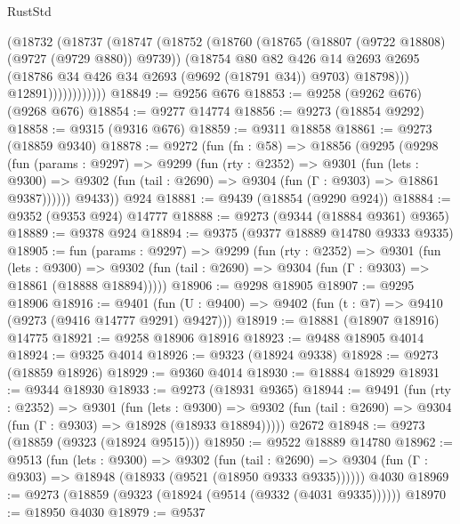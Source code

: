 \begin{lexlean}{RustStd}
\begin{coremodule}
{\begin{coremodule}
{{{{{{{{{{{{{{{{{{{{{{{{{{{{{{{{{{{{{{{{{{{{{{{{{{{{{{{                      (@18732
                        (@18737
                          (@18747
                            (@18752
                              (@18760
                                (@18765 (@18807 (@9722 @18808) (@9727 (@9729 @880)) @9739))
                                (@18754
                                  @80
                                  @82
                                  @426
                                  @14
                                  @2693
                                  @2695
                                  (@18786 @34 @426 @34 @2693 (@9692 (@18791 @34)) @9703)
                                  @18798)))
                            @12891))))))))))))
@18849 := @9256 @676
@18853 := @9258 (@9262 @676) (@9268 @676)
@18854 := @9277 @14774
@18856 := @9273 (@18854 @9292)
@18858 := @9315 (@9316 @676)
@18859 := @9311 @18858
@18861 := @9273 (@18859 @9340)
@18878 := @9272
    (fun (fn : @58) =>
    @18856
      (@9295
        (@9298
          (fun (params : @9297) =>
          @9299
            (fun (rty : @2352) =>
            @9301
              (fun (lets : @9300) =>
              @9302 (fun (tail : @2690) => @9304 (fun (Γ : @9303) => @18861 @9387))))))
        @9433))
    @924
@18881 := @9439 (@18854 (@9290 @924))
@18884 := @9352 (@9353 @924) @14777
@18888 := @9273 (@9344 (@18884 @9361) @9365)
@18889 := @9378 @924
@18894 := @9375 (@9377 @18889 @14780 @9333 @9335)
@18905 := fun (params : @9297) =>
  @9299
    (fun (rty : @2352) =>
    @9301
      (fun (lets : @9300) =>
      @9302 (fun (tail : @2690) => @9304 (fun (Γ : @9303) => @18861 (@18888 @18894)))))
@18906 := @9298 @18905
@18907 := @9295 @18906
@18916 := @9401
    (fun (U : @9400) => @9402 (fun (t : @7) => @9410 (@9273 (@9416 @14777 @9291) @9427)))
@18919 := @18881 (@18907 @18916) @14775
@18921 := @9258 @18906 @18916
@18923 := @9488 @18905 @4014
@18924 := @9325 @4014
@18926 := @9323 (@18924 @9338)
@18928 := @9273 (@18859 @18926)
@18929 := @9360 @4014
@18930 := @18884 @18929
@18931 := @9344 @18930
@18933 := @9273 (@18931 @9365)
@18944 := @9491
    (fun (rty : @2352) =>
    @9301
      (fun (lets : @9300) =>
      @9302 (fun (tail : @2690) => @9304 (fun (Γ : @9303) => @18928 (@18933 @18894)))))
    @2672
@18948 := @9273 (@18859 (@9323 (@18924 @9515)))
@18950 := @9522 @18889 @14780
@18962 := @9513
    (fun (lets : @9300) =>
    @9302
      (fun (tail : @2690) =>
      @9304 (fun (Γ : @9303) => @18948 (@18933 (@9521 (@18950 @9333 @9335))))))
    @4030
@18969 := @9273 (@18859 (@9323 (@18924 (@9514 (@9332 (@4031 @9335))))))
@18970 := @18950 @4030
@18979 := @9537
}}}}}}}}}}}}}}}}}}}}}}}}}}}}}}}}}}}}}}}}}}}}}}}}}}}}}}}
\end{coremodule}}
\end{coremodule}
\end{lexlean}
